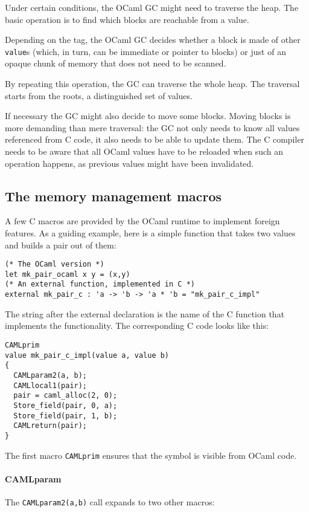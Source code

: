 \documentclass[a4paper]{easychair}
\newcommand{\cpp}[1]{\lstinline[style=C++]{#1}}
\begin{document}
Under certain conditions, the OCaml GC might need to traverse the heap.
The basic operation is to find which blocks are reachable from a value.

Depending on the tag, the OCaml GC decides whether a block is made
of other \cpp{value}s (which, in turn, can be immediate or pointer to
blocks) or just of an opaque chunk of memory that does not need to be
scanned.

By repeating this operation, the GC can traverse the whole heap. The traversal
starts from the roots, a distinguished set of values.

If necessary the GC might also decide to move some blocks.  Moving blocks is more
demanding than mere traversal: the GC not only needs to know all values
referenced from C code, it also needs to be able to update them. The C compiler
needs to be aware that all OCaml values have to be reloaded when such an
operation happens, as previous values might have been invalidated.

\subsection{The memory management macros}

A few C macros are provided by the OCaml runtime to implement foreign
features. As a guiding example, here is a simple function that takes two
values and builds a pair out of them:
%
\begin{lstlisting}[]
(* The OCaml version *)
let mk_pair_ocaml x y = (x,y)
(* An external function, implemented in C *)
external mk_pair_c : 'a -> 'b -> 'a * 'b = "mk_pair_c_impl"
\end{lstlisting}

The string after the external declaration is the name of the C function that
implements the functionality.  The corresponding C code looks like this:
%
\begin{lstlisting}[style=C++]
CAMLprim
value mk_pair_c_impl(value a, value b)
{
  CAMLparam2(a, b);
  CAMLlocal1(pair);
  pair = caml_alloc(2, 0);
  Store_field(pair, 0, a);
  Store_field(pair, 1, b);
  CAMLreturn(pair);
}
\end{lstlisting}

The first macro \cpp{CAMLprim} ensures that the symbol is visible from OCaml
code.

\paragraph{CAMLparam}
The \cpp{CAMLparam2(a,b)} call expands to two other macros:
\end{document}
